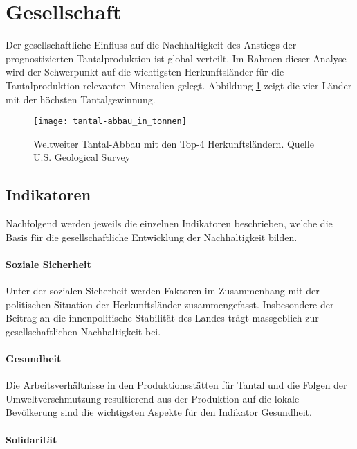 \section{Gesellschaft}\label{sec:society}

Der gesellschaftliche Einfluss auf die Nachhaltigkeit des Anstiegs der
prognostizierten Tantalproduktion ist global verteilt. Im Rahmen dieser Analyse
wird der Schwerpunkt auf die wichtigsten Herkunftsländer für die
Tantalproduktion relevanten Mineralien gelegt. Abbildung \ref{fig:tantal_distribution}
zeigt die vier Länder mit der höchsten Tantalgewinnung.

\begin{figure}[h]
    \centering
    \texttt{[image: tantal-abbau\_in\_tonnen]}
    \caption{Weltweiter Tantal-Abbau mit den Top-4 Herkunftsländern. Quelle U.S. Geological Survey ~\cite{USGSMine8}}
    \label{fig:tantal_distribution}
\end{figure}

\subsection{Indikatoren}

Nachfolgend werden jeweils die einzelnen Indikatoren beschrieben, welche die
Basis für die gesellschaftliche Entwicklung der Nachhaltigkeit bilden.

\paragraph{Soziale Sicherheit}

Unter der sozialen Sicherheit werden Faktoren im Zusammenhang mit der
politischen Situation der Herkunftsländer zusammengefasst. Insbesondere der
Beitrag an die innenpolitische Stabilität des Landes trägt massgeblich zur
gesellschaftlichen Nachhaltigkeit bei.

\paragraph{Gesundheit}

Die Arbeitsverhältnisse in den Produktionsstätten für Tantal und die Folgen
der Umweltverschmutzung resultierend aus der Produktion auf die lokale
Bevölkerung sind die wichtigsten Aspekte für den Indikator Gesundheit.

\paragraph{Solidarität}

